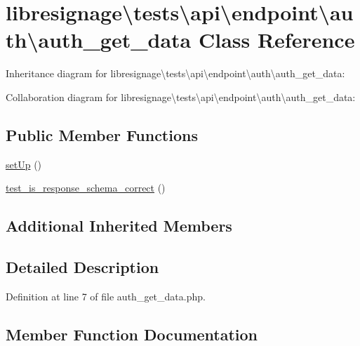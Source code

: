 \hypertarget{classlibresignage_1_1tests_1_1api_1_1endpoint_1_1auth_1_1auth__get__data}{}\section{libresignage\textbackslash{}tests\textbackslash{}api\textbackslash{}endpoint\textbackslash{}auth\textbackslash{}auth\+\_\+get\+\_\+data Class Reference}
\label{classlibresignage_1_1tests_1_1api_1_1endpoint_1_1auth_1_1auth__get__data}


Inheritance diagram for libresignage\textbackslash{}tests\textbackslash{}api\textbackslash{}endpoint\textbackslash{}auth\textbackslash{}auth\+\_\+get\+\_\+data\+:


Collaboration diagram for libresignage\textbackslash{}tests\textbackslash{}api\textbackslash{}endpoint\textbackslash{}auth\textbackslash{}auth\+\_\+get\+\_\+data\+:
\subsection*{Public Member Functions}
\begin{DoxyCompactItemize}
\item 
\hyperlink{classlibresignage_1_1tests_1_1api_1_1endpoint_1_1auth_1_1auth__get__data_ad8ea4b1658bfb80d151588a4bffb5b5f}{set\+Up} ()
\item 
\hyperlink{classlibresignage_1_1tests_1_1api_1_1endpoint_1_1auth_1_1auth__get__data_acd93251e4d67a15bed2b972c08e95b8c}{test\+\_\+is\+\_\+response\+\_\+schema\+\_\+correct} ()
\end{DoxyCompactItemize}
\subsection*{Additional Inherited Members}


\subsection{Detailed Description}


Definition at line 7 of file auth\+\_\+get\+\_\+data.\+php.



\subsection{Member Function Documentation}
\mbox{\label{classlibresignage_1_1tests_1_1api_1_1endpoint_1_1auth_1_1auth__get__data_ad8ea4b1658bfb80d151588a4bffb5b5f}} 
